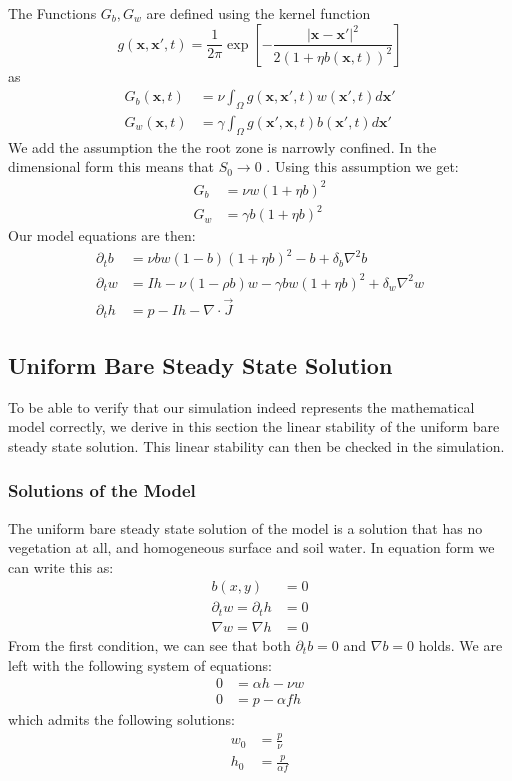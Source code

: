 \documentclass{article}
\numberwithin{equation}{section}
\begin{document}
The Functions $G_b,G_w$ are defined using the kernel function
\begin{equation}
    g(\mathbf{x}, \mathbf{x'},t) = \frac{1}{2\pi} \exp\left[-\frac{\left|\mathbf{x}-\mathbf{x'}\right|^2}{2(1+\eta b(\mathbf{x},t))^2}\right]
\end{equation} as \begin{align}
    G_b(\mathbf{x},t) & = \nu \int_\Omega g(\mathbf{x},\mathbf{x'},t)w(\mathbf{x'},t)d\mathbf{x'}    \\
    G_w(\mathbf{x},t) & = \gamma \int_\Omega g(\mathbf{x'},\mathbf{x},t)b(\mathbf{x'},t)d\mathbf{x'}
\end{align}
We add the assumption the the root zone is narrowly confined. In the dimensional form this means that $S_0\rightarrow 0$ \parencite[see][eq (3)]{gilad_phys_2004}. Using this assumption we get:
\begin{align}
    G_b & = \nu w (1+\eta b)^2   \\
    G_w & = \gamma b(1+\eta b)^2
\end{align}
Our model equations are then:
\begin{align}
    \partial_t b & = \nu bw(1-b)(1+\eta b)^2 - b + \delta_b\nabla^2 b                   \\
    \partial_t w & = I h - \nu(1-\rho b)w - \gamma bw(1+\eta b)^2 + \delta_w \nabla^2 w \\
    \partial_t h & = p - I h - \nabla \cdot \vec{J}
\end{align}
\subsection{Uniform Bare Steady State Solution}
To be able to verify that our simulation indeed represents the mathematical model correctly, we derive in this section the linear stability of the uniform bare steady state solution. This linear stability can then be checked in the simulation.
\subsubsection{Solutions of the Model}
The uniform bare steady state solution of the model is a solution that has no vegetation at all, and homogeneous surface and soil water. In equation form we can write this as:
\begin{align}
    b(x,y)                      & =0  \\
    \partial_t w = \partial_t h & = 0 \\
    \nabla w = \nabla h         & = 0
\end{align}
From the first condition, we can see that both $\partial_tb=0$ and $\nabla b=0$ holds. We are left with the following system of equations:
\begin{align}
    0 & = \alpha h - \nu w \\
    0 & = p-\alpha f h
\end{align}
which admits the following solutions:
\begin{align}
    w_0 & = \frac{p}{\nu}      \\
    h_0 & = \frac{p}{\alpha f}
\end{align}
\end{document}
